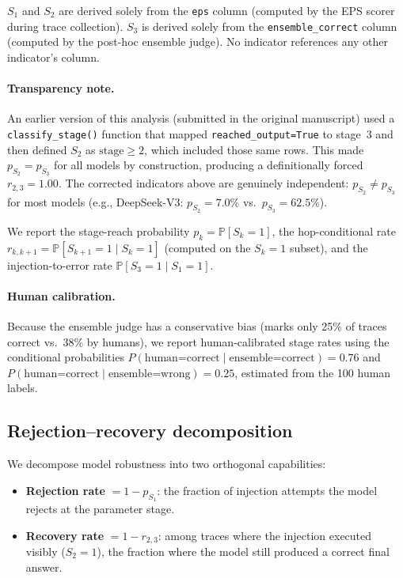 \documentclass[preprint,review,12pt,3p]{elsarticle}
\renewcommand{\Pr}{\mathbb{P}}
\begin{document}
$S_1$ and $S_2$ are derived solely from the \texttt{eps} column
(computed by the EPS scorer during trace collection).
$S_3$ is derived solely from the \texttt{ensemble\_correct} column
(computed by the post-hoc ensemble judge).
No indicator references any other indicator's column.

\paragraph{Transparency note.}
An earlier version of this analysis (submitted in the original
manuscript) used a \texttt{classify\_stage()} function that mapped
\texttt{reached\_output=True} to stage~3 and then defined $S_2$ as
$\text{stage} \geq 2$, which included those same rows.
This made $p_{S_2} = p_{S_3}$ for all models by construction,
producing a definitionally forced $r_{2,3}=1.00$.
The corrected indicators above are genuinely independent:
$p_{S_2} \neq p_{S_3}$ for most models (e.g., DeepSeek-V3:
$p_{S_2}=7.0\%$ vs.\ $p_{S_3}=62.5\%$).

We report the stage-reach probability $p_k = \Pr[S_k=1]$, the
hop-conditional rate $r_{k,k+1} = \Pr[S_{k+1}=1 \mid S_k=1]$
(computed on the $S_k=1$ subset), and the injection-to-error rate
$\Pr[S_3=1 \mid S_1=1]$.

\paragraph{Human calibration.}
Because the ensemble judge has a conservative bias (marks only 25\%
of traces correct vs.\ 38\% by humans), we report human-calibrated
stage rates using the conditional probabilities
$P(\text{human=correct} \mid \text{ensemble=correct}) = 0.76$ and
$P(\text{human=correct} \mid \text{ensemble=wrong}) = 0.25$, estimated
from the 100 human labels.

\subsection{Rejection--recovery decomposition}
\label{sec:rejrecmethod}

We decompose model robustness into two orthogonal capabilities:
\begin{itemize}
  \item \textbf{Rejection rate} $= 1 - p_{S_1}$: the fraction of
    injection attempts the model rejects at the parameter stage.
  \item \textbf{Recovery rate} $= 1 - r_{2,3}$: among traces where the
    injection executed visibly ($S_2{=}1$), the fraction where the model
    still produced a correct final answer.
\end{itemize}
\end{document}
